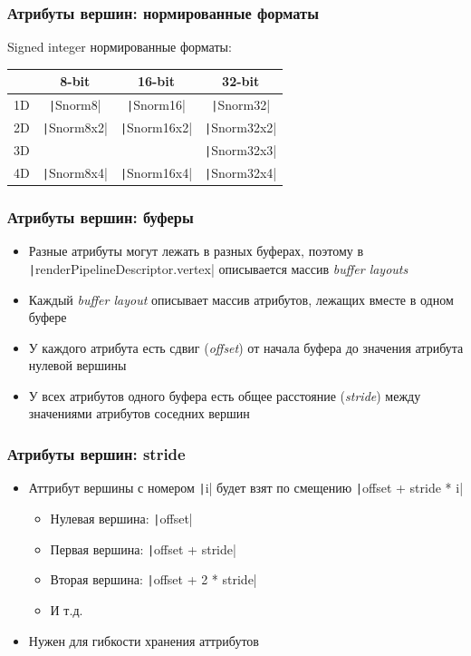 \documentclass[10pt]{beamer}
\begin{document}
\begin{frame}[fragile]
\frametitle{Атрибуты вершин: нормированные форматы}
Signed integer нормированные форматы:
\begin{center}
\begin{tabular}{ |c|c|c|c| } 
\hline
 & 8-bit & 16-bit & 32-bit \\ 
\hline
1D & \texttt|Snorm8| & \texttt|Snorm16| & \texttt|Snorm32| \\ 
\hline
2D & \texttt|Snorm8x2| & \texttt|Snorm16x2| & \texttt|Snorm32x2| \\ 
\hline
3D & & & \texttt|Snorm32x3| \\ 
\hline
4D & \texttt|Snorm8x4| & \texttt|Snorm16x4| & \texttt|Snorm32x4| \\ 
\hline
\end{tabular}
\end{center}
\end{frame}

\begin{frame}[fragile]
\frametitle{Атрибуты вершин: буферы}
\begin{itemize}
\item Разные атрибуты могут лежать в разных буферах, поэтому в \texttt|renderPipelineDescriptor.vertex| описывается массив \textit{buffer layouts}
\pause
\item Каждый \textit{buffer layout} описывает массив атрибутов, лежащих вместе в одном буфере
\pause
\item У каждого атрибута есть сдвиг (\textit{offset}) от начала буфера до значения атрибута нулевой вершины
\pause
\item У всех атрибутов одного буфера есть общее расстояние (\textit{stride}) между значениями атрибутов соседних вершин
\end{itemize}
\end{frame}

\begin{frame}[fragile]
\frametitle{Атрибуты вершин: stride}
\begin{itemize}
\item Аттрибут вершины с номером \texttt|i| будет взят по смещению \texttt|offset + stride * i|
\pause
\begin{itemize}
\item Нулевая вершина: \texttt|offset|
\item Первая вершина: \texttt|offset + stride|
\item Вторая вершина: \texttt|offset + 2 * stride|
\item И т.д.
\end{itemize}
\pause
\item Нужен для гибкости хранения аттрибутов
\end{itemize}
\end{frame}
\end{document}
